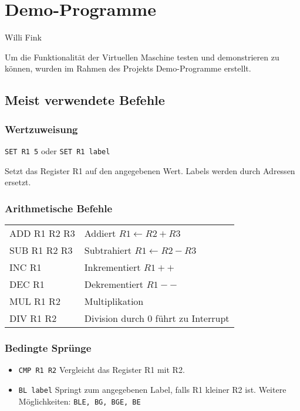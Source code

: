 \section{Demo-Programme}
\begin{flushright}
Willi Fink
\end{flushright}

Um die Funktionalität der Virtuellen Maschine testen und demonstrieren zu
können, wurden im Rahmen des Projekts Demo-Programme erstellt. 
\subsection{Meist verwendete Befehle}
\subsubsection{Wertzuweisung}
 \texttt{SET R1 5} oder \texttt{SET R1 label}
 
 Setzt das Register R1 auf den angegebenen Wert. Labels werden durch Adressen
ersetzt.
 

\subsubsection{Arithmetische Befehle}
\begin{center}
\begin{tabular}{@{\ttfamily}ll}
ADD R1 R2 R3 & Addiert $R1 \gets R2 + R3$ \\
SUB R1 R2 R3 & Subtrahiert $R1 \gets R2 - R3$\\
INC R1 & Inkrementiert $R1++$\\
DEC R1 & Dekrementiert $R1--$\\
MUL R1 R2 & Multiplikation \\
DIV R1 R2 & Division durch 0 führt zu Interrupt
\end{tabular}
\end{center}
\subsubsection{Bedingte Sprünge}
\begin{itemize}
 \item{\texttt{\texttt{CMP R1 R2}}}
 Vergleicht das Register R1 mit R2.
 \item{\texttt{\texttt{BL label}}}
 Springt zum angegebenen Label, falls R1 kleiner R2 ist.
 Weitere Möglichkeiten: \texttt{BLE, BG, BGE, BE}
\end{itemize}

